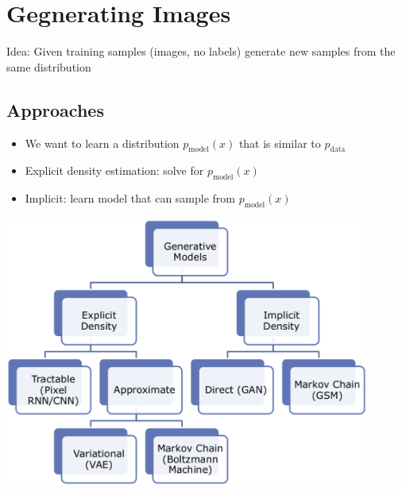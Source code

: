 \section{Gegnerating Images}
Idea: Given training samples (images, no labels) generate new samples from the same distribution

\subsection{Approaches}
\begin{minipage}{0.5\textwidth}
    \begin{itemize}
        \item We want to learn a distribution $p_\text{model}(x)$ that is similar to $p_\text{data}$
        \item Explicit density estimation: solve for $p_\text{model}(x)$
        \item Implicit: learn model that can sample from $p_\text{model}(x)$
    \end{itemize}
\end{minipage}
\begin{minipage}{0.5\textwidth}
    \centering
    \includegraphics[width=0.9\textwidth]{sections/GeneratingImages/img/taxonomy.png}
\end{minipage}

